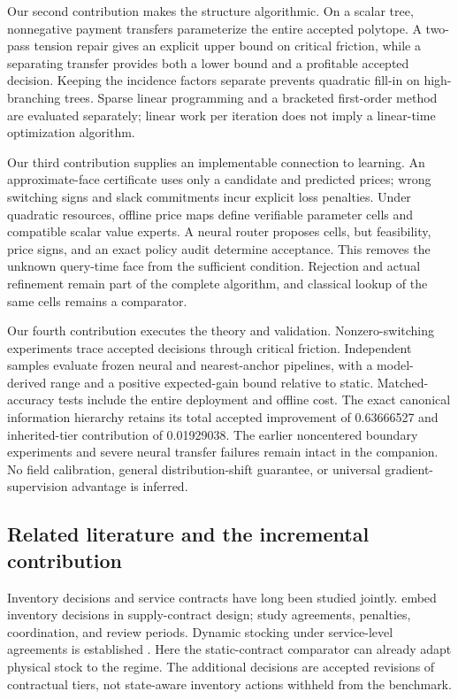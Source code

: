 \documentclass[11pt,letterpaper]{article}
\theoremstyle{definition}
\newcommand{\1}{\mathbf 1}
\begin{document}
Our second contribution makes the structure algorithmic. On a scalar tree, nonnegative payment transfers parameterize the entire accepted polytope. A two-pass tension repair gives an explicit upper bound on critical friction, while a separating transfer provides both a lower bound and a profitable accepted decision. Keeping the incidence factors separate prevents quadratic fill-in on high-branching trees. Sparse linear programming and a bracketed first-order method are evaluated separately; linear work per iteration does not imply a linear-time optimization algorithm.

Our third contribution supplies an implementable connection to learning. An approximate-face certificate uses only a candidate and predicted prices; wrong switching signs and slack commitments incur explicit loss penalties. Under quadratic resources, offline price maps define verifiable parameter cells and compatible scalar value experts. A neural router proposes cells, but feasibility, price signs, and an exact policy audit determine acceptance. This removes the unknown query-time face from the sufficient condition. Rejection and actual refinement remain part of the complete algorithm, and classical lookup of the same cells remains a comparator.

Our fourth contribution executes the theory and validation. Nonzero-switching experiments trace accepted decisions through critical friction. Independent samples evaluate frozen neural and nearest-anchor pipelines, with a model-derived range and a positive expected-gain bound relative to static. Matched-accuracy tests include the entire deployment and offline cost. The exact canonical information hierarchy retains its total accepted improvement of 0.63666527 and inherited-tier contribution of 0.01929038. The earlier noncentered boundary experiments and severe neural transfer failures remain intact in the companion. No field calibration, general distribution-shift guarantee, or universal gradient-supervision advantage is inferred.

\subsection{Related literature and the incremental contribution}
Inventory decisions and service contracts have long been studied jointly. \citet{Henig1997} embed inventory decisions in supply-contract design; \citet{LiangAtkins2013,Sieke2012,Katok2008} study agreements, penalties, coordination, and review periods. Dynamic stocking under service-level agreements is established \citep{Hosseinifard2022,Caggiano2007,Abbasi2022}. Here the static-contract comparator can already adapt physical stock to the regime. The additional decisions are accepted revisions of contractual tiers, not state-aware inventory actions withheld from the benchmark.
\end{document}
